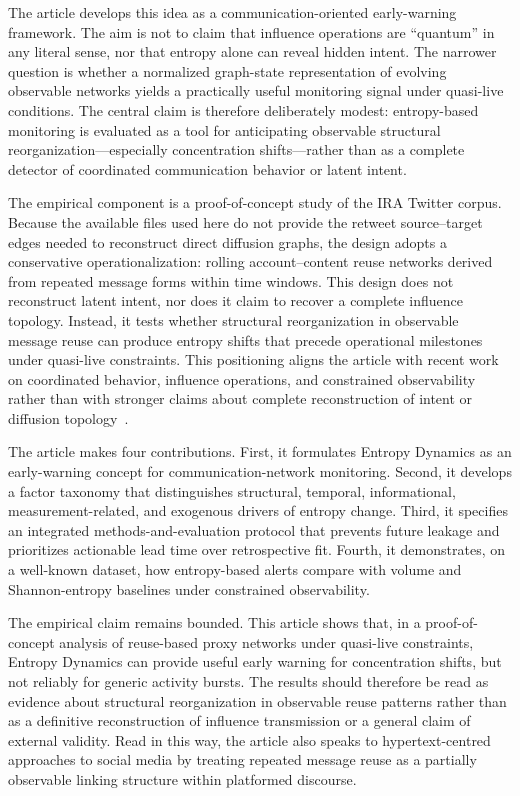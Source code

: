\documentclass[sigconf]{acmart}
\begin{document}
The article develops this idea as a communication-oriented early-warning framework. The aim is not to claim that influence operations are ``quantum'' in any literal sense, nor that entropy alone can reveal hidden intent. The narrower question is whether a normalized graph-state representation of evolving observable networks yields a practically useful monitoring signal under quasi-live conditions. The central claim is therefore deliberately modest: entropy-based monitoring is evaluated as a tool for anticipating observable structural reorganization---especially concentration shifts---rather than as a complete detector of coordinated communication behavior or latent intent.

The empirical component is a proof-of-concept study of the IRA Twitter corpus. Because the available files used here do not provide the retweet source--target edges needed to reconstruct direct diffusion graphs, the design adopts a conservative operationalization: rolling account--content reuse networks derived from repeated message forms within time windows. This design does not reconstruct latent intent, nor does it claim to recover a complete influence topology. Instead, it tests whether structural reorganization in observable message reuse can produce entropy shifts that precede operational milestones under quasi-live constraints. This positioning aligns the article with recent work on coordinated behavior, influence operations, and constrained observability rather than with stronger claims about complete reconstruction of intent or diffusion topology~\cite{bail2020,pacheco2021,sharma2021,schoch2022,wang2023,tardelli2024,LiadiGraus2023,SaezTrumper2014,Zannettou2017}.

The article makes four contributions. First, it formulates Entropy Dynamics as an early-warning concept for communication-network monitoring. Second, it develops a factor taxonomy that distinguishes structural, temporal, informational, measurement-related, and exogenous drivers of entropy change. Third, it specifies an integrated methods-and-evaluation protocol that prevents future leakage and prioritizes actionable lead time over retrospective fit. Fourth, it demonstrates, on a well-known dataset, how entropy-based alerts compare with volume and Shannon-entropy baselines under constrained observability.

The empirical claim remains bounded. This article shows that, in a proof-of-concept analysis of reuse-based proxy networks under quasi-live constraints, Entropy Dynamics can provide useful early warning for concentration shifts, but not reliably for generic activity bursts. The results should therefore be read as evidence about structural reorganization in observable reuse patterns rather than as a definitive reconstruction of influence transmission or a general claim of external validity. Read in this way, the article also speaks to hypertext-centred approaches to social media by treating repeated message reuse as a partially observable linking structure within platformed discourse.
\end{document}
